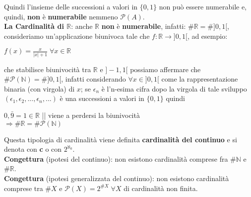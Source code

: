 Quindi l'insieme delle successioni a valori in $\{0, 1\}$  non può essere numerabile e, quindi, \textbf{non} è \textbf{numerabile} nemmeno $\mathcal{P}(A)$. \\ \newline
\textbf{La Cardinalità di $\mathbb{R}$}: anche $\mathbb{R}$ \textbf{non} è \textbf{numerabile}, infatti: $\#\mathbb{R} = \# ]0,1[$, consideriamo un'applicazione biunivoca tale che $f : \mathbb{R} \rightarrow ]0,1[$, ad esempio:
\begin{center}
    $f(x) = \frac{x}{ |x| + 1 } \; \forall x \in \mathbb{R}$
\end{center}
che stabilisce biunivocità tra $\mathbb{R}$ e $] -1, 1[$ possiamo affermare che $\#\mathcal{P}(\mathbb{N}) = \#]0,1[$, infatti considerando $\forall x \in ]0, 1[$ come la rappresentazione binaria (con virgola) di $x$; se $\epsilon_n$ è l'n-esima cifra dopo la virgola di tale sviluppo $(\epsilon_1, \epsilon_2, ..., \epsilon_n, ...)$ è una successioni a valori in $\{0, 1\}$ quindi
\begin{center}
    $0,\bar{9} = 1 \in \mathbb{R}$ || viene a perdersi la biunivocità \\
    $\Rightarrow \#\mathbb{R} = \# \mathcal{P}(\mathbb{N})$
\end{center}
Questa tipologia di cardinalità viene definita \textbf{cardinalità del continuo} e si denota con \textbf{c} o con $2^{\aleph_0}$. \\
\textbf{Congettura} (ipotesi del continuo): non esistono cardinalità comprese fra $\#\mathbb{N}$ e $\#\mathbb{R} $. \\
\textbf{Congettura} (ipotesi generalizzata del continuo): non esistono cardinalità comprese tra $\#X$ e $\mathcal{P}(X) = 2^{\#X} \; \forall X$ di cardinalità non finita.

\newpage
